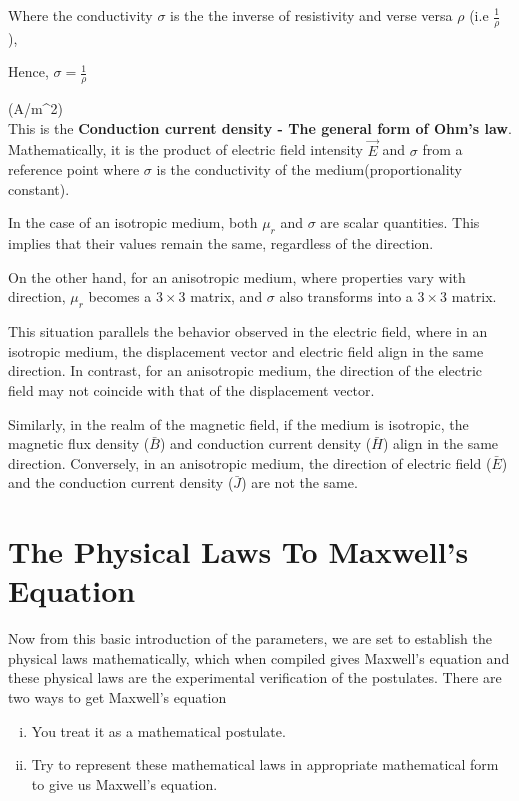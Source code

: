 Where the conductivity $ \sigma $ is the the inverse of resistivity and verse versa $ \rho $ (i.e $ \frac{1}{\rho} $ ), 


Hence, $ \sigma = \frac{1}{\rho}$

\quad (A/m^{2})\\


This is the \textbf{Conduction current density - The general form of Ohm's law}. Mathematically, it is the product of electric field intensity $\vec{E}$ and $\sigma$ from a reference point where $\sigma$ is the conductivity of the medium(proportionality constant).

In the case of an isotropic medium, both \( \mu_r \) and \( \sigma \) are scalar quantities. This implies that their values remain the same, regardless of the direction.

On the other hand, for an anisotropic medium, where properties vary with direction, \( \mu_r \) becomes a \( 3 \times 3 \) matrix, and \( \sigma \) also transforms into a \( 3 \times 3 \) matrix.

This situation parallels the behavior observed in the electric field, where in an isotropic medium, the displacement vector and electric field align in the same direction. In contrast, for an anisotropic medium, the direction of the electric field may not coincide with that of the displacement vector.

Similarly, in the realm of the magnetic field, if the medium is isotropic, the magnetic flux density (\( \bar{B} \)) and conduction current density (\( \bar{H} \)) align in the same direction. Conversely, in an anisotropic medium, the direction of electric field (\( \bar{E} \)) and the conduction current density (\( \bar{J} \)) are not the same.




\section{The Physical Laws To Maxwell's Equation}
Now from this basic introduction of the parameters, we are set to establish the physical laws mathematically, which when compiled gives Maxwell's equation and these physical laws are the experimental verification of the postulates. There are two ways to get Maxwell's equation
\begin{enumerate}[(i)]
\item You treat it as a mathematical postulate.
\item Try to represent these mathematical laws in appropriate mathematical form to give us Maxwell's equation.
\end{enumerate}

